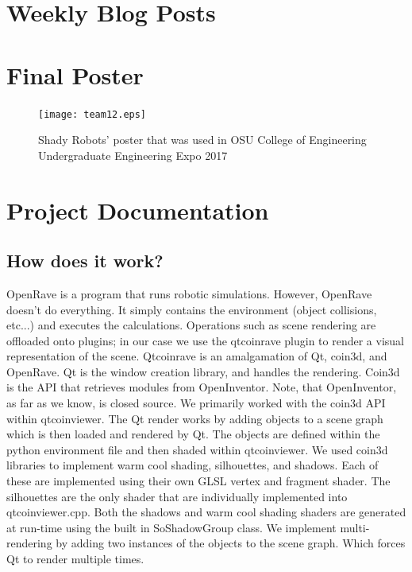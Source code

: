 \documentclass[10pt,journal,compsoc,draftclsnofoot]{IEEEtran}
\begin{document}
\begin{flushleft}
\newpage

\section{Weekly Blog Posts}


\section{Final Poster}
\vfill
\begin{figure} [h]
  \texttt{[image: team12.eps]}
  \caption
{ \newline \hspace{\linewidth}
Shady Robots' poster that was used in OSU College of Engineering Undergraduate Engineering Expo 2017}
  \label{fig:poster}
\end{figure}
\vfill
\newpage

\section{Project Documentation}

\subsection{How does it work?}

OpenRave is a program that runs robotic simulations.
However, OpenRave doesn't do everything.
It simply contains the environment (object collisions, etc...) and executes the calculations.
Operations such as scene rendering are offloaded onto plugins; in our case we use the qtcoinrave plugin to render a visual representation of the scene.
Qtcoinrave is an amalgamation of Qt, coin3d, and OpenRave.
Qt is the window creation library, and handles the rendering.
Coin3d is the API that retrieves modules from OpenInventor.
Note, that OpenInventor, as far as we know, is closed source.
We primarily worked with the coin3d API within qtcoinviewer.
The Qt render works by adding objects to a scene graph which is then loaded and rendered by Qt.
The objects are defined within the python environment file and then shaded within qtcoinviewer.
We used coin3d libraries to implement warm cool shading, silhouettes, and shadows.
Each of these are implemented using their own GLSL vertex and fragment shader.
The silhouettes are the only shader that are individually implemented into qtcoinviewer.cpp.
Both the shadows and warm cool shading shaders are generated at run-time using the built in SoShadowGroup class.
We implement multi-rendering by adding two instances of the objects to the scene graph.
Which forces Qt to render multiple times.


\end{flushleft}
\end{document}
